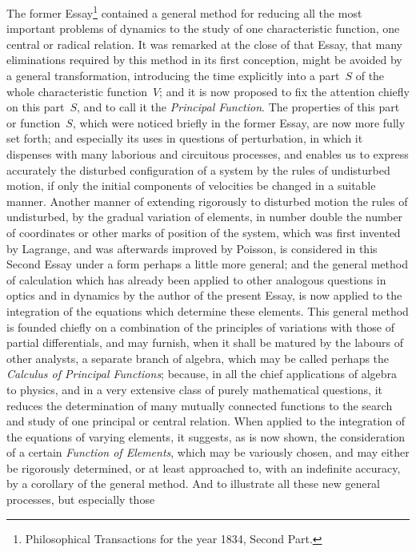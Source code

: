 The former Essay\footnote*{Philosophical Transactions for the
year 1834, Second Part.}
contained a general method for reducing all the
most important problems of dynamics to the study of one
characteristic function, one central or radical relation.  It was
remarked at the close of that Essay, that many eliminations
required by this method in its first conception, might be avoided
by a general transformation, introducing the time explicitly into
a part~$S$ of the whole characteristic function~$V$; and it is
now proposed to fix the attention chiefly on this part~$S$,
and to call it the {\it Principal Function}.  The properties
of this part or function~$S$, which were noticed briefly in the
former Essay, are now more fully set forth; and especially its
uses in questions of perturbation, in which it dispenses with
many laborious and circuitous processes, and enables us to
express accurately the disturbed configuration of a system by the
rules of undisturbed motion, if only the initial components of
velocities be changed in a suitable manner.  Another manner of
extending rigorously to disturbed motion the rules of
undisturbed, by the gradual variation of elements, in number
double the number of coordinates or other marks of position of
the system, which was first invented by {\sc Lagrange}, and was
afterwards improved by {\sc Poisson}, is considered in this Second
Essay under a form perhaps a little more general; and the general
method of calculation which has already been applied to other
analogous questions in optics and in dynamics by the author of the
present Essay, is now applied to the integration of the equations
which determine these elements.  This general method is founded
chiefly on a combination of the principles of variations with
those of partial differentials, and may furnish, when it shall be
matured by the labours of other analysts, a separate branch of
algebra, which may be called perhaps the {\it Calculus of
Principal Functions\/}; because, in all the chief applications of
algebra to physics, and in a very extensive class of purely
mathematical questions, it reduces the determination of many
mutually connected functions to the search and study of one
principal or central relation.  When applied to the integration
of the equations of varying elements, it suggests, as is now
shown, the consideration of a certain {\it Function of Elements},
which may be variously chosen, and may either be rigorously
determined, or at least approached to, with an indefinite
accuracy, by a corollary of the general method.  And to
illustrate all these new general processes, but especially those
